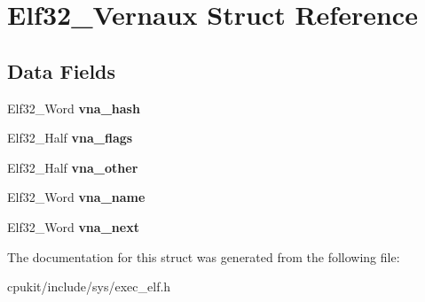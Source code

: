 \hypertarget{structElf32__Vernaux}{}\section{Elf32\+\_\+\+Vernaux Struct Reference}
\label{structElf32__Vernaux}
\subsection*{Data Fields}
\begin{DoxyCompactItemize}
\item 
\mbox{\label{structElf32__Vernaux_aeae097b35e2038c53eabb3fe3e0c7bf1}} 
Elf32\+\_\+\+Word {\bfseries vna\+\_\+hash}
\item 
\mbox{\label{structElf32__Vernaux_a4da8f50d1625f6cf7a0c3415e94958fb}} 
Elf32\+\_\+\+Half {\bfseries vna\+\_\+flags}
\item 
\mbox{\label{structElf32__Vernaux_a28f6da095d6169a589ab3bad837258fc}} 
Elf32\+\_\+\+Half {\bfseries vna\+\_\+other}
\item 
\mbox{\label{structElf32__Vernaux_a8bf6007fe319d74753d03d0fa7977002}} 
Elf32\+\_\+\+Word {\bfseries vna\+\_\+name}
\item 
\mbox{\label{structElf32__Vernaux_acff2104085a8a54ccbb16b0f00be5375}} 
Elf32\+\_\+\+Word {\bfseries vna\+\_\+next}
\end{DoxyCompactItemize}


The documentation for this struct was generated from the following file\+:\begin{DoxyCompactItemize}
\item 
cpukit/include/sys/exec\+\_\+elf.\+h\end{DoxyCompactItemize}
